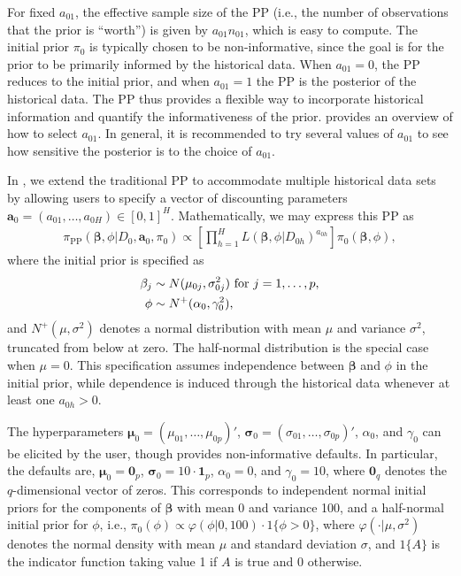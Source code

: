 For fixed $a_{01}$, the effective sample size of the PP (i.e., the number of observations that the prior is ``worth'') is given by $a_{01} n_{01}$, which is easy to compute. The initial prior $\pi_0$ is typically chosen to be non-informative, since the goal is for the prior to be primarily informed by the historical data. When $a_{01} = 0$, the PP reduces to the initial prior, and when $a_{01} = 1$ the PP is the posterior of the historical data. The PP thus provides a flexible way to incorporate historical information and quantify the informativeness of the prior. \citet{ibrahim2015power} provides an overview of how to select $a_{01}$.
In general, it is recommended to try several values of $a_{01}$ to see how sensitive the posterior is to the choice of $a_{01}$.

In , we extend the traditional PP to accommodate multiple historical data sets by allowing users to specify a vector of discounting parameters $\bm{a}_0 = (a_{01}, \ldots, a_{0H}) \in [0,1]^H$.
Mathematically, we may express this PP as
\begin{align}
    \pi_{\text{PP}}(\bm{\beta}, \phi | D_0, \bm{a}_0, \pi_0) \propto \left[\prod_{h = 1}^{H} L(\bm{\beta}, \phi | D_{0h})^{a_{0h}}\right] \pi_0(\bm{\beta}, \phi),
    \label{eq:pp_fixeda0}
\end{align}
where the initial prior is specified as
\begin{align}
    \beta_j &\sim N(\mu_{0j},  \sigma_{0j}^2) \text{ for } j = 1, \ldots, p, \notag \\
    \phi &\sim N^{+}(\alpha_0, \gamma_0^2),
    \label{eq:pp_fixeda0_initialprior}
\end{align} 
and $N^{+}(\mu, \sigma^2)$ denotes a normal distribution with mean $\mu$ and variance $\sigma^2$, truncated from below at zero. The half-normal distribution is the special case when $\mu = 0$.
This specification assumes independence between $\bm{\beta}$ and $\phi$ in the initial prior, while dependence is induced through the historical data whenever at least one $a_{0h} > 0$.

The hyperparameters $\bm{\mu}_0 = (\mu_{01}, \ldots, \mu_{0p})'$, $\bm{\sigma}_0 = (\sigma_{01}, \ldots, \sigma_{0p})'$, $\alpha_0$, and $\gamma_0$ can be elicited by the user, though  provides non-informative defaults.
In particular, the defaults are, $\bm{\mu}_0 = \bm{0}_p$, $\bm{\sigma}_0 = 10 \cdot \bm{1}_p$, $\alpha_0 = 0$, and $\gamma_0 = 10$, where $\bm{0}_q$ denotes the $q$-dimensional vector of zeros. This corresponds to independent normal initial priors for the components of $\bm{\beta}$ with mean 0 and variance 100, and a half-normal initial prior for $\phi$, i.e., $\pi_0(\phi) \propto \varphi(\phi | 0, 100) \cdot 1\{ \phi > 0 \}$, where $\varphi(\cdot | \mu, \sigma^2)$ denotes the normal density with mean $\mu$ and standard deviation $\sigma$, and $1\{ A \}$ is the indicator function taking value 1 if $A$ is true and $0$ otherwise. 

